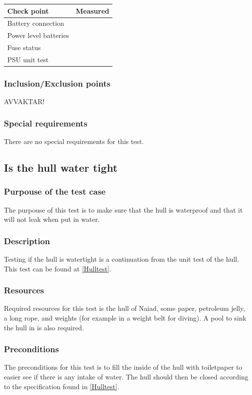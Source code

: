 \documentclass[10pt,a4paper]{article}
\begin{document}
\begin{tabular}{| l | c |}
\hline
Check point & Measured \\ \hline
Battery connection &  \\ \hline
Power level batteries &  \\ \hline
Fuse status & \\ \hline
PSU unit test & \\ \hline
\end{tabular} 
\subsubsection*{Inclusion/Exclusion points}
AVVAKTAR!
\subsubsection*{Special requirements}
There are no special requirements for this test. 

\subsection{Is the hull water tight}
\subsubsection*{Purpouse of the test case}
The purpouse of this test is to make sure that the hull is waterproof and that it will not leak when put in water. 
\subsubsection*{Description}
Testing if the hull is watertight is a continuation from the unit test of the hull. This test can be found at \ref{Hulltest}.
\subsubsection*{Resources}
Required resources for this test is the hull of Naiad, some paper, petroleum jelly, a long rope, and weights (for example in a weight belt for diving). A pool to sink the hull in is also required. 
\subsubsection*{Preconditions}
The preconditions for this test is to fill the inside of the hull with toiletpaper to easier see if there is any intake of water. The hull should then be closed according to the specification found in \ref{Hulltest}.
\end{document}
